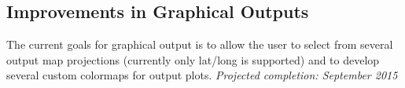 \documentclass{article}
\begin{document}
\subsection{Improvements in Graphical Outputs}
The current goals for graphical output is to allow the user to select from several output map projections (currently only lat/long is supported) and to develop several custom colormaps for output plots. \emph{Projected completion: September 2015}

\newpage


\end{document}
